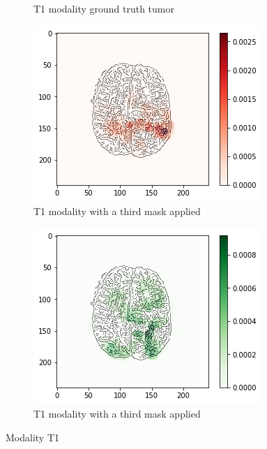 \begin{figure}[H]
\begin{subfigure}[t]{.24\textwidth}
        \caption{T1 modality ground truth tumor}
    \end{subfigure}
    \begin{subfigure}[t]{.24\textwidth}
        \centering
        \includegraphics[width=\linewidth]{chapters/06_hdm/b_Brats18_TCIA08_242_1_L2/23.png}
        \caption{T1 modality with a third mask applied}
    \end{subfigure}
    \begin{subfigure}[t]{.24\textwidth}
        \centering
        \includegraphics[width=\linewidth]{chapters/06_hdm/b_Brats18_TCIA08_242_1_L2/24.png}
        \caption{T1 modality with a third mask applied}
    \end{subfigure}
    \caption{Modality T1}
\end{figure}


